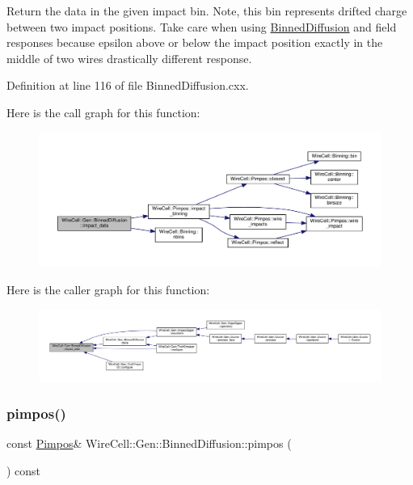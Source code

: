 Return the data in the given impact bin. Note, this bin represents drifted charge between two impact positions. Take care when using \hyperlink{class_wire_cell_1_1_gen_1_1_binned_diffusion}{Binned\+Diffusion} and field responses because epsilon above or below the impact position exactly in the middle of two wires drastically different response. 

Definition at line 116 of file Binned\+Diffusion.\+cxx.

Here is the call graph for this function\+:
\nopagebreak
\begin{figure}[H]
\begin{center}
\leavevmode
\includegraphics[width=350pt]{class_wire_cell_1_1_gen_1_1_binned_diffusion_a22377d1afccdee836981ce2979ab49b4_cgraph}
\end{center}
\end{figure}
Here is the caller graph for this function\+:
\nopagebreak
\begin{figure}[H]
\begin{center}
\leavevmode
\includegraphics[width=350pt]{class_wire_cell_1_1_gen_1_1_binned_diffusion_a22377d1afccdee836981ce2979ab49b4_icgraph}
\end{center}
\end{figure}
\mbox{\label{class_wire_cell_1_1_gen_1_1_binned_diffusion_acdc13c03fa55ddc92c6cd134d07b6bf3}} 
\subsubsection{\texorpdfstring{pimpos()}{pimpos()}}
{\footnotesize\ttfamily const \hyperlink{class_wire_cell_1_1_pimpos}{Pimpos}\& Wire\+Cell\+::\+Gen\+::\+Binned\+Diffusion\+::pimpos (\begin{DoxyParamCaption}{ }\end{DoxyParamCaption}) const\hspace{0.3cm}{\ttfamily [inline]}}



